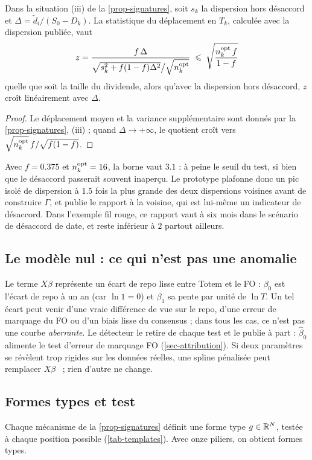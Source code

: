 \begin{proposition}[Masquage]\label{prop-masking}
Dans la situation (iii) de la \cref{prop-signatures}, soit $s_k$ la dispersion hors désaccord et
$\Delta=\tilde d_i/(S_0-D_k)$. La statistique du déplacement en $T_k$, calculée avec la dispersion publiée, vaut
\[
z=\frac{f\,\Delta}{\sqrt{s_k^2+f(1-f)\Delta^2}\big/\sqrt{n^{\mathrm{opt}}_k}}\;\leqslant\;\sqrt{\frac{n^{\mathrm{opt}}_k\,f}{1-f}}
\]
quelle que soit la taille du dividende, alors qu'avec la dispersion hors désaccord, $z$ croît linéairement avec
$\Delta$.
\end{proposition}
\begin{proof}
Le déplacement moyen et la variance supplémentaire sont donnés par la \cref{prop-signatures}, (iii) ; quand
$\Delta\to+\infty$, le quotient croît vers $\sqrt{n^{\mathrm{opt}}_k}\,f/\sqrt{f(1-f)}$.
\end{proof}
Avec $f=\num{0.375}$ et $n^{\mathrm{opt}}_k=16$, la borne vaut $\num{3.1}$ : à peine le seuil du test, si bien que le désaccord
passerait souvent inaperçu. Le prototype plafonne donc un pic isolé de dispersion à $\num{1.5}$ fois la plus grande des
deux dispersions voisines avant de construire $\Gamma$, et publie le rapport à la voisine, qui est lui-même un
indicateur de désaccord. Dans l'exemple fil rouge, ce rapport vaut \vRunTimingRatio{} à six mois dans le scénario de
désaccord de date, et reste inférieur à $2$ partout ailleurs.

\subsection{Le modèle nul : ce qui n'est pas une anomalie}\label{sec-null}
Le terme $X\beta$ représente un écart de repo lisse entre Totem et le FO : $\beta_0$ est l'écart de repo à un an (car
$\ln1=0$) et $\beta_1$ sa pente par unité de $\ln T$. Un tel écart peut venir d'une vraie différence de vue sur le repo,
d'une erreur de marquage du FO ou d'un biais lisse du consensus ; dans tous les cas, ce n'est pas une courbe
\emph{aberrante}. Le détecteur le retire de chaque test et le publie à part : $\hat\beta_0$ alimente le test d'erreur de
marquage FO (\cref{sec-attribution}). Si deux paramètres se révèlent trop rigides sur les données réelles, une spline
pénalisée peut remplacer $X\beta$~\cite{eilers1996} ; rien d'autre ne change.

\subsection{Formes types et test}\label{sec-test}
Chaque mécanisme de la \cref{prop-signatures} définit une forme type $g\in\mathbb{R}^N$, testée à chaque position possible
(\cref{tab-templates}). Avec onze piliers, on obtient \vNTemplates{} formes types.

